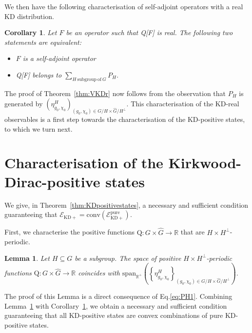 \documentclass[a4paper, notitlepage, 11pt]{article}
\numberwithin{equation}{section}
\newcommand{\mcl}[1]{\ensuremath{\mathcal{#1}}}
\newcommand{\EcalKDC}{{\mcl E}_{\mathrm{KD+}}}
\newcommand{\EcalKDCpu}{{\mcl E}_{\mathrm{KD+}}^{\mathrm{pure}}}
\newcommand{\R}{\mathbb{R}}
\newcommand{\conv}[1]{\mathrm{conv}\left(#1\right)}
\newtheorem{Cor}[Theorem]{Corollary}
\newtheorem{Lemma}[Theorem]{Lemma}
\begin{document}
We then have the following characterisation of self-adjoint operators with a real KD distribution.
\begin{Cor}\label{cor:SAO}
    Let $F$ be an operator such that Q[F] is real. The following two statements are equivalent: 
    \begin{itemize}[leftmargin=*,label=\textbullet]
        \item $F$ is a self-adjoint operator
        \item Q[F] belongs to $\displaystyle \sum_{H \mathrm{ \ subgroup \ of \ } G} P_{H}$.
    \end{itemize}
\end{Cor}

The proof of Theorem~\ref{thm:VKDr} now follows from the observation that $P_{H}$ is generated by $\left( \eta^{H}_{g_0,\chi_0}\right)_{(g_0,\chi_0)\in G/ H \times \hat{G}/ H^{\perp}}.$ 
This characterisation of the KD-real observables is a first step towards the characterisation of the KD-positive states, to which we turn next. 

\section{Characterisation of the Kirkwood-Dirac-positive states}\label{sec:CharKDpos}
 We give, in Theorem~\ref{thm:KDpositivestates}, a necessary and sufficient condition guaranteeing that $\EcalKDC = \conv{\EcalKDCpu}$. 
 
 First, we characterise the positive functions $\mathrm{Q}: G\times \hat{G} \to \R$ that are $H\times H^{\perp}$-periodic.
\begin{Lemma}\label{lem:posFunc}
Let $H\subseteq G$ be a subgroup. The space of positive $H\times H^{\perp}$-periodic functions $\mathrm{Q}: G\times \hat{G} \to \R$ coincides with $\mathrm{span}_{\R^{+}}\left(\left\{\eta^{H}_{g_0,\chi_0}\right\}_{(g_0,\chi_0)\in G/ H \times \hat{G}/ H^{\perp} }\right)$.
\end{Lemma}
The proof of this Lemma is a direct consequence of Eq.\eqref{eq:PH1}. 
Combining Lemma~\ref{lem:posFunc} with Corollary~\ref{cor:SAO}, we obtain a necessary and sufficient condition guaranteeing that all KD-positive states are convex combinations of pure KD-positive states.
\end{document}
